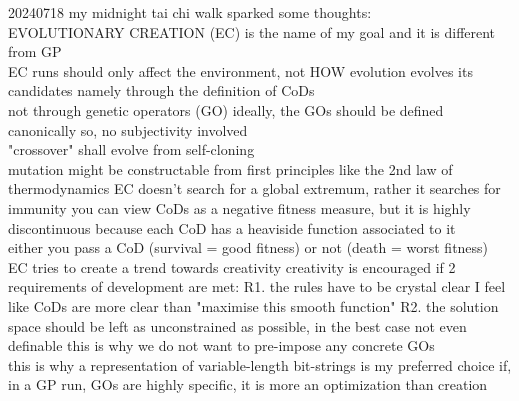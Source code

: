 \documentclass{article}\usepackage[margin=2cm]{geometry}
\begin{document}
\begin{cascade}
    20240718
    \stepin
    my midnight tai chi walk sparked some thoughts:\\
    EVOLUTIONARY CREATION (EC) is the name of my goal and it is different from GP\\
    EC runs should only affect the environment, not HOW evolution evolves its candidates
    \stepin
    namely through the definition of CoDs\\
    not through genetic operators (GO)
    \stepin
    ideally, the GOs should be defined canonically
    \stepin
    so, no subjectivity involved\\
    "crossover" shall evolve from self-cloning\\
    mutation might be constructable from first principles
    \stepin
    like the 2nd law of thermodynamics
    \stepout
    \stepout
    \stepout
    \stepout
    EC doesn't search for a global extremum, rather it searches for immunity
    \stepin
    you can view CoDs as a negative fitness measure, but it is highly discontinuous
    \stepin
    because each CoD has a heaviside function associated to it\\
    either you pass a CoD (survival = good fitness) or not (death = worst fitness)
    \stepout
    \stepout
    EC tries to create a trend towards creativity 
    \stepin
    creativity is encouraged if 2 requirements of development are met:
    \stepin
    R1. the rules have to be crystal clear
    \stepin
    I feel like CoDs are more clear than "maximise this smooth function"
    \stepout
    R2. the solution space should be left as unconstrained as possible, in the best case not even definable
    \stepin
    this is why we do not want to pre-impose any concrete GOs\\
    this is why a representation of variable-length bit-strings is my preferred choice
    \stepout
    \stepout
    \stepout
    if, in a GP run, GOs are highly specific, it is more an optimization than creation
\end{cascade}
\end{document}
